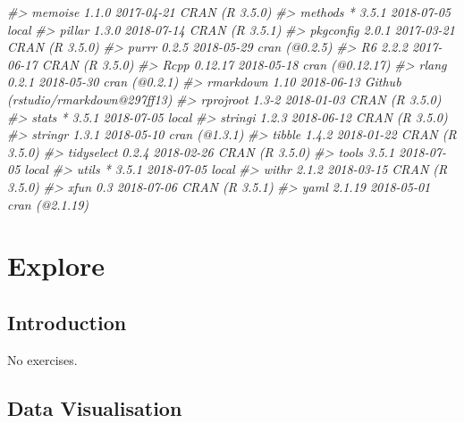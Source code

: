 \documentclass[]{book}
\newenvironment{Shaded}{\begin{snugshade}}{\end{snugshade}}
\newcommand{\CommentTok}[1]{\textcolor[rgb]{0.56,0.35,0.01}{\textit{#1}}}
\theoremstyle{plain}
\theoremstyle{remark}
\theoremstyle{definition}
\theoremstyle{definition}
\theoremstyle{definition}
\theoremstyle{remark}
\begin{document}
\begin{Shaded}
\begin{Highlighting}[]
\CommentTok{#>  memoise      1.1.0   2017-04-21 CRAN (R 3.5.0)                    }
\CommentTok{#>  methods    * 3.5.1   2018-07-05 local                             }
\CommentTok{#>  pillar       1.3.0   2018-07-14 CRAN (R 3.5.1)                    }
\CommentTok{#>  pkgconfig    2.0.1   2017-03-21 CRAN (R 3.5.0)                    }
\CommentTok{#>  purrr        0.2.5   2018-05-29 cran (@0.2.5)                     }
\CommentTok{#>  R6           2.2.2   2017-06-17 CRAN (R 3.5.0)                    }
\CommentTok{#>  Rcpp         0.12.17 2018-05-18 cran (@0.12.17)                   }
\CommentTok{#>  rlang        0.2.1   2018-05-30 cran (@0.2.1)                     }
\CommentTok{#>  rmarkdown    1.10    2018-06-13 Github (rstudio/rmarkdown@297ff13)}
\CommentTok{#>  rprojroot    1.3-2   2018-01-03 CRAN (R 3.5.0)                    }
\CommentTok{#>  stats      * 3.5.1   2018-07-05 local                             }
\CommentTok{#>  stringi      1.2.3   2018-06-12 CRAN (R 3.5.0)                    }
\CommentTok{#>  stringr      1.3.1   2018-05-10 cran (@1.3.1)                     }
\CommentTok{#>  tibble       1.4.2   2018-01-22 CRAN (R 3.5.0)                    }
\CommentTok{#>  tidyselect   0.2.4   2018-02-26 CRAN (R 3.5.0)                    }
\CommentTok{#>  tools        3.5.1   2018-07-05 local                             }
\CommentTok{#>  utils      * 3.5.1   2018-07-05 local                             }
\CommentTok{#>  withr        2.1.2   2018-03-15 CRAN (R 3.5.0)                    }
\CommentTok{#>  xfun         0.3     2018-07-06 CRAN (R 3.5.1)                    }
\CommentTok{#>  yaml         2.1.19  2018-05-01 cran (@2.1.19)}
\end{Highlighting}
\end{Shaded}

\hypertarget{part-explore}{%
\part{Explore}\label{part-explore}}

\hypertarget{explore-intro}{%
\chapter{Introduction}\label{explore-intro}}

No exercises.

\hypertarget{data-visualisation}{%
\chapter{Data Visualisation}\label{data-visualisation}}
\end{document}
